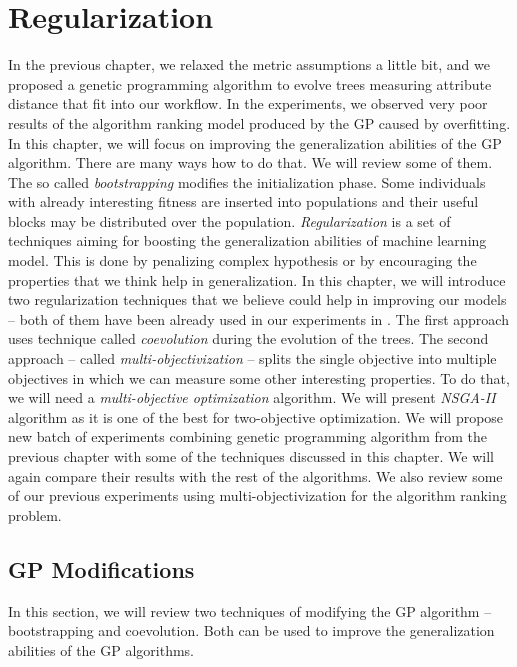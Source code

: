 \chapter{Regularization}
\label{chapter:regularization}
In the previous chapter, we relaxed the metric assumptions a little bit, and we proposed a genetic programming algorithm to evolve trees measuring attribute distance that fit into our workflow. 
In the experiments, we observed very poor results of the algorithm ranking model produced by the GP caused by overfitting. 
In this chapter, we will focus on improving the generalization abilities of the GP algorithm. There are many ways how to do that. We will review some of them. The so called \emph{bootstrapping} modifies the initialization phase. Some individuals with already interesting fitness are inserted into populations and their useful blocks may be distributed over the population.
\emph{Regularization} \cite{LearningFromData} is a set of techniques aiming for boosting the generalization abilities of machine learning model. This is done by penalizing complex hypothesis or by encouraging the properties that we think help in generalization. In this chapter, we will introduce two regularization techniques that we believe could help in improving our models -- both of them have been already used in our experiments in \cite{jaCEC2015,jaSSCI2015}. The first approach uses technique called \emph{coevolution} during the evolution of the trees. The second approach -- called \emph{multi-objectivization} -- splits the single objective into multiple objectives in which we can measure some other interesting properties. To do that, we will need a \emph{multi-objective optimization} algorithm. We will present \emph{NSGA-II} algorithm as it is one of the best for two-objective optimization. We will propose new batch of experiments combining genetic programming algorithm from the previous chapter with some of the techniques discussed in this chapter. We will again compare their results with the rest of the algorithms. We also review some of our previous experiments using multi-objectivization for the algorithm ranking problem.

\section{GP Modifications}
In this section, we will review two techniques of modifying the GP algorithm -- bootstrapping and coevolution. Both can be used to improve the generalization abilities of the GP algorithms.

